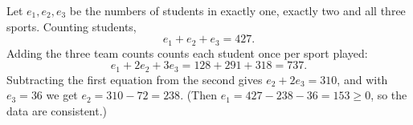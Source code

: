 Let $e_1,e_2,e_3$ be the numbers of students in exactly one, exactly two and all three sports. Counting students,
\[
e_1+e_2+e_3=427 .
\]
Adding the three team counts counts each student once per sport played:
\[
e_1+2e_2+3e_3=128+291+318=737 .
\]
Subtracting the first equation from the second gives $e_2+2e_3=310$, and with $e_3=36$ we get $e_2=310-72=\boxed{238}$. (Then $e_1=427-238-36=153\ge0$, so the data are consistent.)
